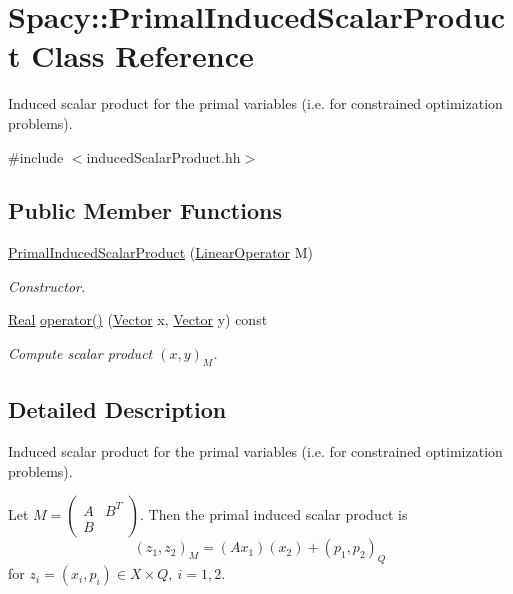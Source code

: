 \hypertarget{classSpacy_1_1PrimalInducedScalarProduct}{}\section{Spacy\+:\+:Primal\+Induced\+Scalar\+Product Class Reference}
\label{classSpacy_1_1PrimalInducedScalarProduct}


Induced scalar product for the primal variables (i.\+e. for constrained optimization problems).  




{\ttfamily \#include $<$induced\+Scalar\+Product.\+hh$>$}

\subsection*{Public Member Functions}
\begin{DoxyCompactItemize}
\item 
\hyperlink{classSpacy_1_1PrimalInducedScalarProduct_acfea3362a4d59ae0c689bd525870d830}{Primal\+Induced\+Scalar\+Product} (\hyperlink{classSpacy_1_1LinearOperator}{Linear\+Operator} M)
\begin{DoxyCompactList}\small\item\em Constructor. \end{DoxyCompactList}\item 
\hyperlink{classSpacy_1_1Real}{Real} \hyperlink{classSpacy_1_1PrimalInducedScalarProduct_a74ba39d9a97f3c782088493450c03a6b}{operator()} (\hyperlink{classSpacy_1_1Vector}{Vector} x, \hyperlink{classSpacy_1_1Vector}{Vector} y) const \hypertarget{classSpacy_1_1PrimalInducedScalarProduct_a74ba39d9a97f3c782088493450c03a6b}{}\label{classSpacy_1_1PrimalInducedScalarProduct_a74ba39d9a97f3c782088493450c03a6b}

\begin{DoxyCompactList}\small\item\em Compute scalar product $(x,y)_M$. \end{DoxyCompactList}\end{DoxyCompactItemize}


\subsection{Detailed Description}
Induced scalar product for the primal variables (i.\+e. for constrained optimization problems). 

Let $ M = \left( \begin{array}{ccc} A & B^T \\ B & \end{array} \right)$. Then the primal induced scalar product is \[ (z_1,z_2)_M = (Ax_1)(x_2) + (p_1,p_2)_Q \] for $z_i = (x_i,p_i)\in X\times Q,\ i=1,2$. 

